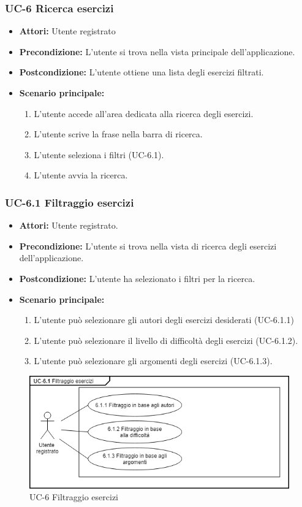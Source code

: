 \subsubsection{UC-6 Ricerca esercizi}
		\begin{itemize}
			\item\textbf{ Attori:} Utente registrato
			\item \textbf{Precondizione:} L'utente si trova nella vista principale dell'applicazione.
			\item \textbf{Postcondizione:} L'utente ottiene una lista degli esercizi filtrati.
			\item \textbf{Scenario principale:}
				\begin{enumerate}
					\item L'utente accede all'area dedicata alla ricerca degli esercizi.
					\item L'utente scrive la frase nella barra di ricerca.
					\item L'utente seleziona i filtri (UC-6.1).
					\item L'utente avvia la ricerca.
				\end{enumerate}
		\end{itemize}

\subsubsection{UC-6.1 Filtraggio esercizi }
\begin{itemize}
\item \textbf{Attori:} Utente registrato.
			\item \textbf{Precondizione:} L'utente si trova nella vista di ricerca degli esercizi dell'applicazione.
			\item \textbf{Postcondizione:} L'utente ha selezionato i filtri per la ricerca.
			\item \textbf{Scenario principale:}
				\begin{enumerate}
					\item L'utente può selezionare gli autori degli esercizi desiderati (UC-6.1.1)
					\item L'utente può selezionare il livello di difficoltà degli esercizi (UC-6.1.2).
					\item L'utente può selezionare gli argomenti degli esercizi (UC-6.1.3).
				\end{enumerate}
\end{itemize}
\begin{figure}[h]
	\centering
	\includegraphics[scale=0.7]{images/UC-6.png}
	\caption{UC-6 Filtraggio esercizi}
\end{figure}	

